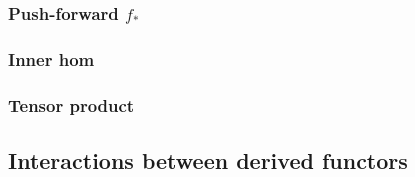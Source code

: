 \subsubsection{Push-forward $f_*$}
\subsubsection{Inner hom}
\subsubsection{Tensor product }

\subsection{Interactions between derived functors}

